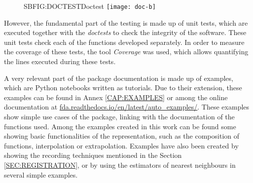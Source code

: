 \begin{figure}[Doctest]{SBFIG:DOCTEST}{Doctest}
	\texttt{[image: doc-b]}
\end{figure}

However, the fundamental part of the testing is made up of unit tests, which are
executed together with the \textit{doctests} to check the integrity of the software.
These unit tests check each of the functions developed separately. In order to measure the coverage of these tests, the tool \textit{Coverage} was used, which allows quantifying the lines executed during these tests.

A very relevant part of the package documentation is made up of examples,
which are Python notebooks written as tutorials. Due to their extension, these
examples can be found in Annex \ref{CAP:EXAMPLES} or among the online documentation
at \href{https://fda.readthedocs.io/en/latest/auto_examples/}{fda.readthedocs.io/en/latest/auto\_examples/}.
These examples show simple use cases of the package, linking with the documentation of the functions used. Among the examples created in this work can be found some showing basic functionalities of the representation, such as the composition of functions, interpolation or extrapolation. Examples have also been created by showing the recording techniques mentioned in the Section \ref{SEC:REGISTRATION}, or by using the estimators of nearest neighbours in several simple examples.
